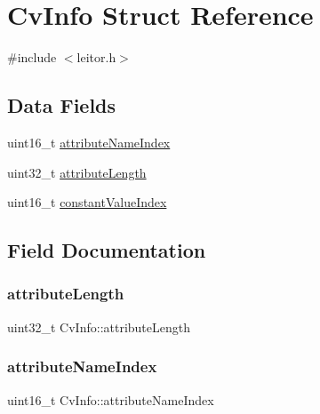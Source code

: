 \hypertarget{structCvInfo}{}\section{Cv\+Info Struct Reference}
\label{structCvInfo}


{\ttfamily \#include $<$leitor.\+h$>$}

\subsection*{Data Fields}
\begin{DoxyCompactItemize}
\item 
uint16\+\_\+t \hyperlink{structCvInfo_ab33f866a4dfccc3684b00cadde84aec4}{attribute\+Name\+Index}
\item 
uint32\+\_\+t \hyperlink{structCvInfo_a58d31f430ddf05c081616479997ebf34}{attribute\+Length}
\item 
uint16\+\_\+t \hyperlink{structCvInfo_a44e05b3248c82f0c649a36cd66098e4c}{constant\+Value\+Index}
\end{DoxyCompactItemize}


\subsection{Field Documentation}
\mbox{\label{structCvInfo_a58d31f430ddf05c081616479997ebf34}} 
\subsubsection{\texorpdfstring{attribute\+Length}{attributeLength}}
{\footnotesize\ttfamily uint32\+\_\+t Cv\+Info\+::attribute\+Length}

\mbox{\label{structCvInfo_ab33f866a4dfccc3684b00cadde84aec4}} 
\subsubsection{\texorpdfstring{attribute\+Name\+Index}{attributeNameIndex}}
{\footnotesize\ttfamily uint16\+\_\+t Cv\+Info\+::attribute\+Name\+Index}

\mbox{\label{structCvInfo_a44e05b3248c82f0c649a36cd66098e4c}} 
